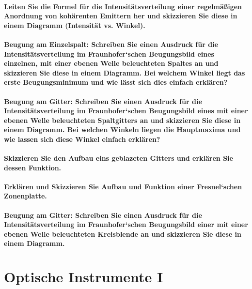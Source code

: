 \documentclass[a4paper, 11pt, parskip=half]{scrartcl}
\begin{document}
\paragraph{Leiten Sie die Formel für die Intensitätsverteilung einer regelmäßigen Anordnung von
kohärenten Emittern her und skizzieren Sie diese in einem Diagramm (Intensität vs.
Winkel).}

\paragraph{Beugung am Einzelspalt: Schreiben Sie einen Ausdruck für die Intensitätsverteilung im
Fraunhofer‘schen Beugungsbild eines einzelnen, mit einer ebenen Welle beleuchteten
Spaltes an und skizzieren Sie diese in einem Diagramm. Bei welchem Winkel liegt das erste
Beugungsminimum und wie lässt sich dies einfach erklären?}

\paragraph{Beugung am Gitter: Schreiben Sie einen Ausdruck für die Intensitätsverteilung im
Fraunhofer‘schen Beugungsbild eines mit einer ebenen Welle beleuchteten Spaltgitters an
und skizzieren Sie diese in einem Diagramm. Bei welchen Winkeln liegen die Hauptmaxima
und wie lassen sich diese Winkel einfach erklären?}

\paragraph{Skizzieren Sie den Aufbau eins geblazeten Gitters und erklären Sie dessen Funktion.}

\paragraph{Erklären und Skizzieren Sie Aufbau und Funktion einer Fresnel‘schen Zonenplatte.}

\paragraph{Beugung am Gitter: Schreiben Sie einen Ausdruck für die Intensitätsverteilung im
Fraunhofer‘schen Beugungsbild einer mit einer ebenen Welle beleuchteten Kreisblende an
und skizzieren Sie diese in einem Diagramm.}

\newpage

\section{Optische Instrumente I}
\end{document}
